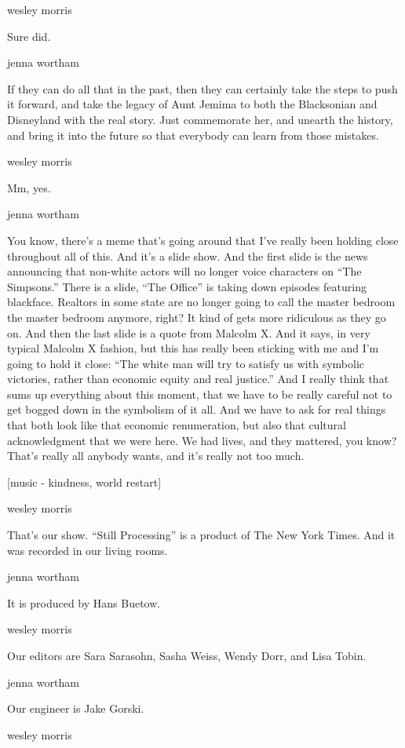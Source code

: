 wesley morris

Sure did.

jenna wortham

If they can do all that in the past, then they can certainly take the
steps to push it forward, and take the legacy of Aunt Jemima to both the
Blacksonian and Disneyland with the real story. Just commemorate her,
and unearth the history, and bring it into the future so that everybody
can learn from those mistakes.

wesley morris

Mm, yes.

jenna wortham

You know, there's a meme that's going around that I've really been
holding close throughout all of this. And it's a slide show. And the
first slide is the news announcing that non-white actors will no longer
voice characters on ``The Simpsons.'' There is a slide, ``The Office''
is taking down episodes featuring blackface. Realtors in some state are
no longer going to call the master bedroom the master bedroom anymore,
right? It kind of gets more ridiculous as they go on. And then the last
slide is a quote from Malcolm X. And it says, in very typical Malcolm X
fashion, but this has really been sticking with me and I'm going to hold
it close: ``The white man will try to satisfy us with symbolic
victories, rather than economic equity and real justice.'' And I really
think that sums up everything about this moment, that we have to be
really careful not to get bogged down in the symbolism of it all. And we
have to ask for real things that both look like that economic
renumeration, but also that cultural acknowledgment that we were here.
We had lives, and they mattered, you know? That's really all anybody
wants, and it's really not too much.

{[}music - kindness, world restart{]}

wesley morris

That's our show. ``Still Processing'' is a product of The New York
Times. And it was recorded in our living rooms.

jenna wortham

It is produced by Hans Buetow.

wesley morris

Our editors are Sara Sarasohn, Sasha Weiss, Wendy Dorr, and Lisa Tobin.

jenna wortham

Our engineer is Jake Gorski.

wesley morris

